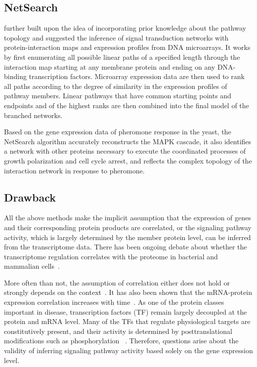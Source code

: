 \subsection{NetSearch}
\cite{Steffen2002} further built upon the idea of incorporating 
prior knowledge about the pathway topology and suggested
the inference of signal transduction networks with protein-interaction maps
and expression profiles from DNA microarrays.
It works by first enumerating all possible linear paths
of a specified length through the interaction map starting
at any membrane protein and ending on any DNA-binding
transcription factors.
Microarray expression data are then used
to rank all paths according to the degree of similarity in
the expression profiles of pathway members.
Linear pathways
that have common starting points and endpoints
and of the highest ranks are then combined into the final
model of the branched networks.

Based on the gene expression data of pheromone response in the yeast, the 
NetSearch algorithm accurately reconstructs the MAPK cascade, it also identifies a 
network with other proteins necessary to execute the coordinated processes of 
growth polarization and cell cycle arrest, and reflects the complex topology of 
the interaction network in response to pheromone.

\subsection{Drawback}
All the above methods make the implicit assumption that the expression of genes
and their corresponding protein products are correlated, or the signaling 
pathway activity, which is largely determined by the member protein level, 
can be inferred from the transcriptome data. There has been ongoing debate 
about whether the transcriptome regulation correlates with the proteome
in bacterial and mammalian cells~\citep{Taniguchi2010,Ghazalpour2011}. 

More
often than not, the assumption of correlation either does not hold or strongly depends on the context~\citep{Soufi2009}. 
It has also been shown that the mRNA-protein expression correlation increases 
with time~\citep{Fournier2010}.
As one of the protein classes important in disease, 
transcription factors (TF) remain largely decoupled at the 
protein
and mRNA level. Many of the TFs that regulate physiological
    targets are constitutively present, and their activity is determined
    by posttranslational modifications such as phosphorylation%
    ~\citep{Messina2004}.
Therefore, questions arise about the validity of inferring signaling 
pathway activity based solely on the gene expression level.

